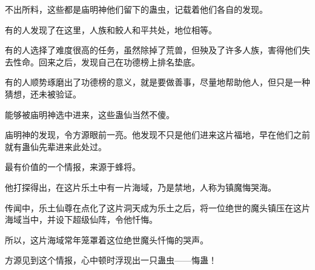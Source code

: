 \begin{this_body}
不出所料，这些都是庙明神他们留下的蛊虫，记载着他们各自的发现。

有的人发现了在这里，人族和鲛人和平共处，地位相等。

有的人选择了难度很高的任务，虽然除掉了荒兽，但殃及了许多人族，害得他们失去性命。回来之后，发现自己在功德榜上排名垫底。

有的人顺势琢磨出了功德榜的意义，就是要做善事，尽量地帮助他人，但只是一种猜想，还未被验证。

能够被庙明神选中进来，这些蛊仙当然不傻。

庙明神的发现，令方源眼前一亮。他发现不只是他们进来这片福地，早在他们之前就有蛊仙先辈进来此处过。

最有价值的一个情报，来源于蜂将。

他打探得出，在这片乐土中有一片海域，乃是禁地，人称为镇魔悔哭海。

传闻中，乐土仙尊在点化了这片洞天成为乐土之后，将一位绝世的魔头镇压在这片海域当中，并设下超级仙阵，令他忏悔。

所以，这片海域常年笼罩着这位绝世魔头忏悔的哭声。

方源见到这个情报，心中顿时浮现出一只蛊虫——悔蛊！

\end{this_body}

